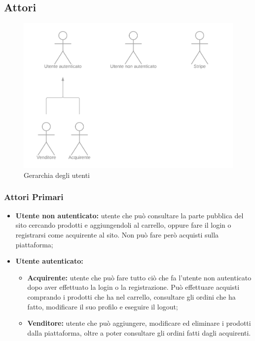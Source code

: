 \subsection{Attori} \label{Attori}

\begin{figure}[ht]
    \centering
    \includegraphics[width=\textwidth]{Immagini/DiagrammiUC/Attori.png}
    \caption{Gerarchia degli utenti} 
    \label{fig:Registrazione}
\end{figure}

\subsubsection{Attori Primari}
\begin{itemize}
    \item \textbf{Utente non autenticato:} utente che può consultare la parte pubblica del sito cercando prodotti e aggiungendoli al carrello, oppure fare il login o registrarsi come acquirente al sito. Non può fare però acquisti sulla piattaforma;
    \item \textbf{Utente autenticato:}
    \begin{itemize}
        \item \textbf{Acquirente:} utente che può fare tutto ciò che fa l'utente non autenticato dopo aver effettuato la login o la registrazione. Può effettuare acquisti comprando i prodotti che ha nel carrello, consultare gli ordini che ha fatto, modificare il suo profilo e eseguire il logout;
        \item \textbf{Venditore:} utente che può aggiungere, modificare ed eliminare i prodotti dalla piattaforma, oltre a poter consultare gli ordini fatti dagli acquirenti.
    \end{itemize}
\end{itemize}
